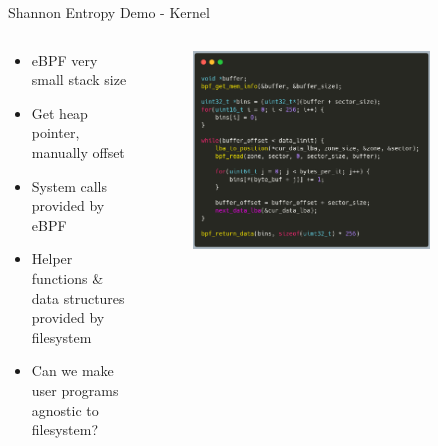 \documentclass[aspectratio=169, notes]{beamer}
\begin{document}
\begin{frame}{Shannon Entropy Demo - Kernel}
        \begin{columns}
            \begin{column}{0.40\textwidth}
                \footnotesize
                \begin{itemize}
                    \item eBPF very small stack size
                    \item Get heap pointer, manually offset
                    \item System calls provided by eBPF
                    \item Helper functions \& data structures provided
                          by filesystem
                    \item Can we make user programs agnostic to filesystem?
                \end{itemize}
            \end{column}
            \begin{column}{0.60\textwidth}
                \begingroup
                \small
                \begin{figure}
                    \centering
                    \includegraphics[width=0.85\textwidth]{resources/images/demo-kernel-3.png}
                \end{figure}
                \endgroup
            \end{column}
        \end{columns}
\end{frame}
\end{document}

